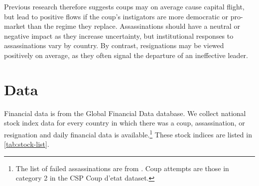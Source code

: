 \documentclass[12pt,final,fleqn]{article}
\theoremstyle{plain}
\begin{document}

Previous research therefore suggests coups may on average cause capital flight, but lead to positive flows if the coup's instigators are more democratic or pro-market than the regime they replace.  Assassinations should have a neutral or negative impact as they increase uncertainty, but institutional responses to assassinations vary by country. By contrast, resignations may be viewed positively on average, as they often signal the departure of an ineffective leader. 


\section{Data}


Financial data is from the Global Financial Data database. We collect national stock index data for every country in which there was a coup, assassination, or resignation and daily financial data is available.\footnote{The list of failed assassinations are from \citet{jones2009hit}. Coup attempts are those in category 2 in the CSP Coup d'etat dataset.} These stock indices are listed in \autoref{tab:stock-list}.
\end{document}
